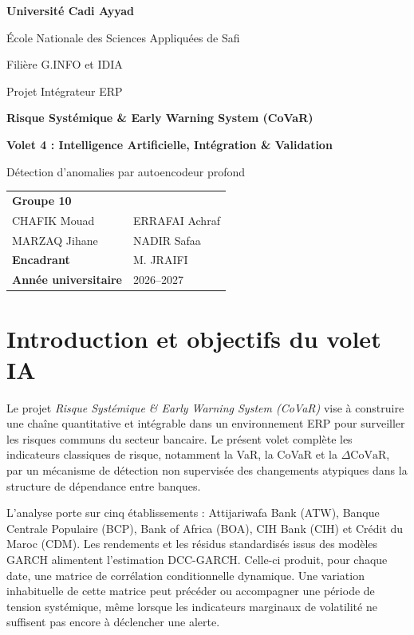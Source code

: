 \documentclass[12pt,a4paper]{article}
\begin{document}
\begin{titlepage}
  \centering
  \vspace*{1cm}
  {\Large \textbf{Université Cadi Ayyad}\par}
  \vspace{0.3cm}
  {\large École Nationale des Sciences Appliquées de Safi\par}
  \vspace{0.3cm}
  {\large Filière G.INFO et IDIA\par}
  \vfill
  {\Large Projet Intégrateur ERP\par}
  \vspace{0.5cm}
  {\Huge \textbf{Risque Systémique \& Early Warning System (CoVaR)}\par}
  \vspace{0.8cm}
  {\LARGE \textbf{Volet 4 : Intelligence Artificielle, Intégration \& Validation}\par}
  \vspace{0.5cm}
  {\Large Détection d'anomalies par autoencodeur profond\par}
  \vfill
  \begin{tabular}{ll}
    \textbf{Groupe 10} & \\
    CHAFIK Mouad & ERRAFAI Achraf \\
    MARZAQ Jihane & NADIR Safaa \\
    \textbf{Encadrant} & M. JRAIFI \\
    \textbf{Année universitaire} & 2026--2027
  \end{tabular}
  \vfill
\end{titlepage}

\tableofcontents
\clearpage

\section{Introduction et objectifs du volet IA}

Le projet \emph{Risque Systémique \& Early Warning System (CoVaR)} vise à construire une chaîne
quantitative et intégrable dans un environnement ERP pour surveiller les risques communs du
secteur bancaire. Le présent volet complète les indicateurs classiques de risque, notamment la
VaR, la CoVaR et la $\Delta\mathrm{CoVaR}$, par un mécanisme de détection non supervisée des
changements atypiques dans la structure de dépendance entre banques.

L'analyse porte sur cinq établissements : Attijariwafa Bank (ATW), Banque Centrale Populaire
(BCP), Bank of Africa (BOA), CIH Bank (CIH) et Crédit du Maroc (CDM). Les rendements et les
résidus standardisés issus des modèles GARCH alimentent l'estimation DCC-GARCH. Celle-ci produit,
pour chaque date, une matrice de corrélation conditionnelle dynamique. Une variation inhabituelle
de cette matrice peut précéder ou accompagner une période de tension systémique, même lorsque
les indicateurs marginaux de volatilité ne suffisent pas encore à déclencher une alerte.
\end{document}
